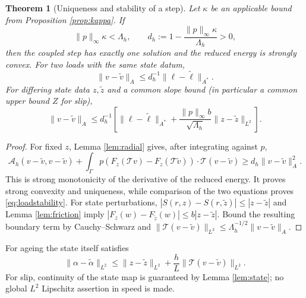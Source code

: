 \documentclass[11pt,a4paper]{article}
\newtheorem{theorem}{Theorem}[section]
\theoremstyle{definition}\newtheorem{definition}[theorem]{Definition}
\theoremstyle{remark}\newtheorem{remark}[theorem]{Remark}
\newcommand{\norm}[1]{\lVert #1\rVert}
\newcommand{\A}{\mathcal A}
\newcommand{\tr}{\mathcal T}
\numberwithin{equation}{section}
\begin{document}
\begin{theorem}[Uniqueness and stability of a step]\label{thm:unique}
Let $\kappa$ be an applicable bound from Proposition \ref{prop:kappa}. If
\begin{equation}\label{eq:uniquenesscriterion}
 \norm p_\infty\kappa<\Lambda_h,
 \qquad d_h:=1-\frac{\norm p_\infty\kappa}{\Lambda_h}>0,
\end{equation}
then the coupled step has exactly one solution and the reduced energy is strongly convex. For two loads with the same state datum,
\begin{equation}\label{eq:loadstability}
 \norm{v-\widetilde v}_A
 \le d_h^{-1}\norm{\ell-\widetilde\ell}_{A^*}.
\end{equation}
For differing state data $z,\widetilde z$ and a common slope bound (in particular a common upper bound $Z$ for slip),
\begin{equation}\label{eq:datastability}
 \norm{v-\widetilde v}_A\le d_h^{-1}
 \left[\norm{\ell-\widetilde\ell}_{A^*}
 +\frac{\norm p_\infty b}{\sqrt{\Lambda_h}}
       \norm{z-\widetilde z}_{L^2}\right].
\end{equation}
\end{theorem}
\begin{proof}
For fixed $z$, Lemma \ref{lem:radial} gives, after integrating against $p$,
\[
 \A_h(v-\widetilde v,v-\widetilde v)
 +\int_\Gamma p(F_z(\tr v)-F_z(\tr\widetilde v))\cdot\tr(v-\widetilde v)
 \ge d_h\norm{v-\widetilde v}_A^2.
\]
This is strong monotonicity of the derivative of the reduced energy. It proves strong convexity and uniqueness, while comparison of the two equations proves \eqref{eq:loadstability}. For state perturbations, $|S(r,z)-S(r,\widetilde z)|\le|z-\widetilde z|$ and Lemma \ref{lem:friction} imply
$|F_z(w)-F_{\widetilde z}(w)|\le b|z-\widetilde z|$.
Bound the resulting boundary term by Cauchy--Schwarz and
$\norm{\tr(v-\widetilde v)}_{L^2}\le\Lambda_h^{-1/2}\norm{v-\widetilde v}_A$.
\end{proof}
For ageing the state itself satisfies
\[
 \norm{\alpha-\widetilde\alpha}_{L^2}
 \le\norm{z-\widetilde z}_{L^2}+\frac hL\norm{\tr(v-\widetilde v)}_{L^2}.
\]
For slip, continuity of the state map is guaranteed by Lemma \ref{lem:state}; no global $L^2$ Lipschitz assertion in speed is made.
\end{document}

